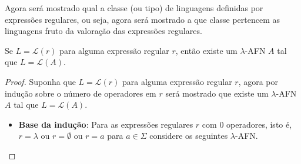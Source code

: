 Agora será mostrado qual a classe (ou tipo) de linguagens definidas por expressões regulares, ou seja, agora será mostrado a que classe pertencem as linguagens fruto da valoração das expressões regulares.

\begin{theorem}\label{teo:Exp-AFN}
	Se $L = \mathcal{L}(r)$ para alguma expressão regular $r$, então existe um $\lambda$-AFN $A$ tal que $L = \mathcal{L}(A)$.
\end{theorem}

\begin{proof}
	Suponha que $L = \mathcal{L}(r)$ para alguma expressão regular $r$, agora por indução sobre o número de operadores em $r$ será mostrado que existe um $\lambda$-AFN $A$ tal que $L = \mathcal{L}(A)$.
	
	\begin{itemize}
		\item \textbf{Base da indução}: Para as expressões regulares $r$ com $0$ operadores, isto é, $r = \lambda$ ou $r = \emptyset$ ou $r = a$ para $a \in \Sigma$ considere os seguintes $\lambda$-AFN.
		
		\begin{figure}[h]
			\centering
			\quad\quad\quad
			\quad\quad\quad
\end{figure}
\end{itemize}
\end{proof}
